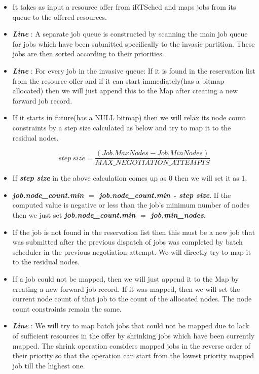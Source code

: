 \begin{itemize}
\item It takes as input a resource offer from iRTSched and maps jobs from its queue to the offered resources.
\item \textbf{\textit{Line }}: A separate job queue is constructed by scanning the main job queue for jobs which have been submitted specifically to the invasic partition. These jobs are then sorted according to their priorities.
\item \textbf{\textit{Line }}: For every job in the invasive queue: If it is found in the reservation list from the resource offer and if it can start immediately(has a bitmap allocated) then we will just append this to the Map after creating a new forward job record.
\item If it starts in future(has a NULL bitmap) then we will relax its node count constraints by a step size calculated as below and try to map it to the residual nodes.
\vspace{-0.30in}
\begin{center}
\boldmath\begin{equation*}
step\ size = \frac{(Job.MaxNodes - Job.MinNodes)}{MAX\_NEGOTIATION\_ATTEMPTS}
\end{equation*}
\end{center}
\item If \textbf{\textit{step size}} in the above calculation comes up as $0$ then we will set it as $1$.
\item \textbf{\textit{job.node\_count.min $=$ job.node\_count.min - step size}}. If the computed value is negative or less than the job's minimum number of nodes then we just set \textbf{\textit{job.node\_count.min $=$ job.min\_nodes}}.
\item If the job is not found in the reservation list then this must be a new job that was submitted after the previous dispatch of jobs was completed by batch scheduler in the previous negotiation attempt. We will directly try to map it to the residual nodes.
\item If a job could not be mapped, then we will just append it to the Map by creating a new forward job record. If it was mapped, then we will set the current node count of that job to the count of the allocated nodes. The node count constraints remain the same.
\item \textbf{\textit{Line }}: We will try to map batch jobs that could not be mapped due to lack of sufficient resources in the offer by shrinking jobs which have been currently mapped. The shrink operation considers mapped jobs in the reverse order of their priority so that the operation can start from the lowest priority mapped job till the highest one.

\end{itemize}
